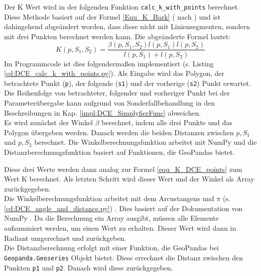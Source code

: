 {	Der K Wert wird in der folgenden Funktion \lstinline|calc_k_with_points| berechnet. Diese Methode basiert auf der Formel \ref{Equ_K_Bark} ( nach \citet{Latecki1999a}) und ist dahingehend abgeändert worden, dass diese nicht mit Liniensegmenten, sondern mit drei Punkten berechnet werden kann. Die abgeänderte Formel lautet:
	\begin{equation}
		K(p,S_1,S_2) = \frac{\beta(p, S_1, S_2)l(p, S_1)l(p, S_2)}{l(p, S_1) + l(p, S_2)} 
		\label{equ_K_DCE_points}
	\end{equation}
	Im Programmcode ist dies folgendermaßen implementiert (s. Listing \ref{cd:DCE_calc_k_with_points.py}). Als Eingabe wird das Polygon, der betrachtete Punkt (\lstinline|p|), der folgende (\lstinline|s1|) und der vorherige (\lstinline|s2|) Punkt erwartet. Die Reihenfolge von betrachteter, folgender und vorheriger Punkt bei der Parameterübergabe kann aufgrund von Sonderfallbehandlung in den Beschreibungen in Kap. \ref{impl:DCE_SimplyfierFunc} abweichen. \\ 
	Es wird zunächst der Winkel $\beta$ berechnet, indem alle drei Punkte und das Polygon übergeben werden. Danach werden die beiden Distanzen zwischen $p, S_1$ und $p, S_2$ berechnet. Die Winkelberechnungsfunktion arbeitet mit NumPy und die Distanzberechnungsfunktion basiert auf Funktionen, die GeoPandas bietet.
	
	Diese drei Werte werden dann analog zur Formel \ref{equ_K_DCE_points} zum Wert K berechnet. Als letzten Schritt wird dieser Wert und der Winkel als Array zurückgegeben. \\
	Die Winkelberechnungsfunktion arbeitet mit dem Arcustangens und $\pi$ \ifimportant (s. \ref{cd:DCE_angle_and_distance.py}) \fi. Dies basiert auf der Dokumentation von NumPy \citep{numpy_angle}. Da die Berechnung ein Array ausgibt, müssen alle Elemente aufsummiert werden, um einen Wert zu erhalten. Dieser Wert wird dann in Radiant umgerechnet und zurückgeben. \\
	Die Distanzberechnung erfolgt mit einer Funktion, die GeoPandas bei \lstinline|Geopanda.Geoseries| Objekt bietet. Diese errechnet die Distanz zwischen den Punkten \lstinline|p1| und \lstinline|p2|. Danach wird diese zurückgegeben.
	\ifimportant
	
	\fi

}
